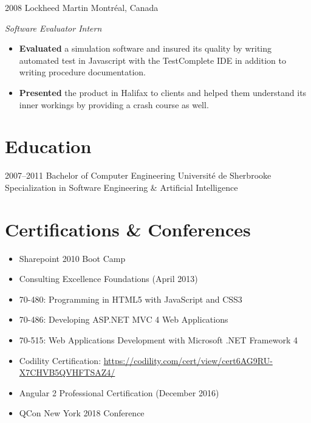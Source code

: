 \documentclass[]{friggeri-cv}
\begin{document}
\begin{entrylist}

\entry
{2008}
{Lockheed Martin}
{Montréal, Canada}
{\emph{Software Evaluator Intern}
	\begin{itemize}
		\item \textbf{Evaluated} a simulation software and insured its quality by writing automated test in Javascript with the TestComplete IDE in addition to writing procedure documentation.
		\item \textbf{Presented} the product in Halifax to clients and helped them understand its inner workings by providing a crash course as well.
	\end{itemize}}


\end{entrylist}

\section{Education}
\begin{entrylist}
    \entry
{2007--2011}
{Bachelor {\normalfont of Computer Engineering}}
{Université de Sherbrooke}
{Specialization in Software Engineering \& Artificial Intelligence}
\end{entrylist}


\section{Certifications \& Conferences}

\begin{itemize}
	\item Sharepoint 2010 Boot Camp
	\item Consulting Excellence Foundations (April 2013)
	\item 70-480: Programming in HTML5 with JavaScript and CSS3
	\item 70-486: Developing ASP.NET MVC 4 Web Applications
	\item 70-515: Web Applications Development with Microsoft .NET Framework 4
	\item Codility Certification: \href{https://codility.com/cert/view/cert6AG9RU-X7CHVB5QVHFTSAZ4/}{https://codility.com/cert/view/cert6AG9RU-X7CHVB5QVHFTSAZ4/}
	\item Angular 2 Professional Certification (December 2016)
	\item QCon New York 2018 Conference
\end{itemize}
\end{document}

